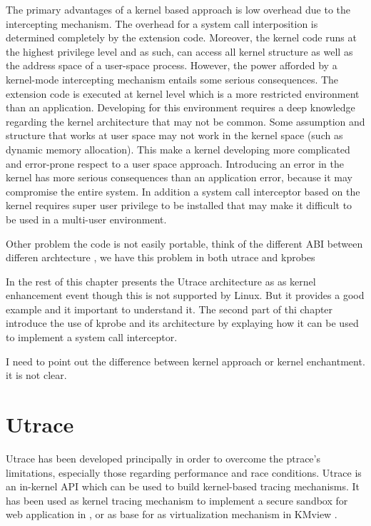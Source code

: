  
The primary advantages of a kernel based approach is low overhead due to the intercepting mechanism. The overhead for a system call interposition is determined completely by the extension code. Moreover, the kernel code runs at the highest privilege level and as such, can access all kernel structure as well as the address space of a user-space process. However, the power afforded by a kernel-mode intercepting mechanism entails some serious consequences. The extension code is executed at kernel level which is a more restricted environment than an application. Developing for this environment requires a deep knowledge regarding the kernel architecture that may not be common. Some assumption and structure that works at user space may not work in the kernel space (such as dynamic memory allocation). This make a kernel developing more complicated and error-prone respect to a user space approach. Introducing an error in the kernel has more serious consequences than an application error, because it may compromise the entire system. In addition a system call interceptor based on the kernel requires super user privilege to be installed that may make it difficult to be used in a multi-user environment.

Other problem the code is not easily portable, think of the different ABI between differen archtecture , we have this problem in both utrace and kprobes

In the rest of this chapter presents the Utrace architecture as as kernel enhancement event though this is not supported by Linux. But it provides a good example and it important to understand it. 
The second part of thi chapter introduce the use of kprobe and its architecture by explaying how it can be used to implement a system call interceptor.  

I need to point out the difference between kernel approach or kernel enchantment. 
it is not clear.  

\section{Utrace}
Utrace has been developed principally in order to overcome the ptrace’s limitations, especially those regarding performance and race conditions. Utrace is an in-kernel API which can be used to build kernel-based tracing mechanisms. It has been used as kernel tracing mechanism to implement a secure sandbox for web application in \nocite{OcvtavianPurdila:2006:Utrace}, or as base for as virtualization mechanism in KMview \nocite{RenzoDavoli:2007:Online}.  

